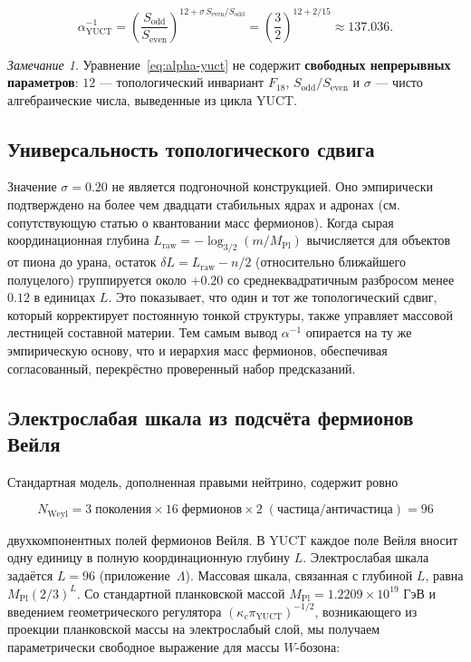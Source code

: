 \documentclass[12pt,a4paper]{article}
\theoremstyle{remark}
\newtheorem{remark}[theorem]{Замечание}
\begin{document}
	\begin{equation}
		\boxed{\alpha^{-1}_{\mathrm{YUCT}} =
			\left(\frac{S_{\mathrm{odd}}}{S_{\mathrm{even}}}\right)^{12 + \sigma\,S_{\mathrm{even}}/S_{\mathrm{odd}}}
			= \left(\frac{3}{2}\right)^{12 + 2/15}
			\approx 137.036 } .
		\label{eq:alpha-yuct}
	\end{equation}
	
	\begin{remark}
		Уравнение~\eqref{eq:alpha-yuct} не содержит \textbf{свободных непрерывных параметров}: \(12\) --- топологический инвариант \(F_{18}\), \(S_{\mathrm{odd}}/S_{\mathrm{even}}\) и \(\sigma\) --- чисто алгебраические числа, выведенные из цикла YUCT.
	\end{remark}
	
	\subsection{Универсальность топологического сдвига}
	
	Значение \(\sigma = 0.20\) не является подгоночной конструкцией. Оно эмпирически подтверждено на более чем двадцати стабильных ядрах и адронах (см. сопутствующую статью о квантовании масс фермионов). Когда сырая координационная глубина \(L_{\mathrm{raw}} = -\log_{3/2}(m/M_{\mathrm{Pl}})\) вычисляется для объектов от пиона до урана, остаток \(\delta L = L_{\mathrm{raw}} - n/2\) (относительно ближайшего полуцелого) группируется около \(+0.20\) со среднеквадратичным разбросом менее \(0.12\) в единицах \(L\). Это показывает, что один и тот же топологический сдвиг, который корректирует постоянную тонкой структуры, также управляет массовой лестницей составной материи. Тем самым вывод \(\alpha^{-1}\) опирается на ту же эмпирическую основу, что и иерархия масс фермионов, обеспечивая согласованный, перекрёстно проверенный набор предсказаний.
	
	\subsection{Электрослабая шкала из подсчёта фермионов Вейля}
	
	Стандартная модель, дополненная правыми нейтрино, содержит ровно
	
	\begin{equation}
		N_{\mathrm{Weyl}} = 3\;\text{поколения} \times 16\;\text{фермионов}
		\times 2\;(\text{частица/античастица}) = 96
	\end{equation}
	
	двухкомпонентных полей фермионов Вейля. В YUCT каждое поле Вейля вносит одну единицу в полную координационную глубину \(L\). Электрослабая шкала задаётся \(L = 96\) (приложение~\(\Lambda\)). Массовая шкала, связанная с глубиной \(L\), равна \(M_{\mathrm{Pl}} (2/3)^{L}\). Со стандартной планковской массой \(M_{\mathrm{Pl}} = 1.2209 \times 10^{19}\) ГэВ и введением геометрического регулятора \((\kappa_c \pi_{\mathrm{YUCT}})^{-1/2}\), возникающего из проекции планковской массы на электрослабый слой, мы получаем параметрически свободное выражение для массы \(W\)-бозона:
	
\end{document}
